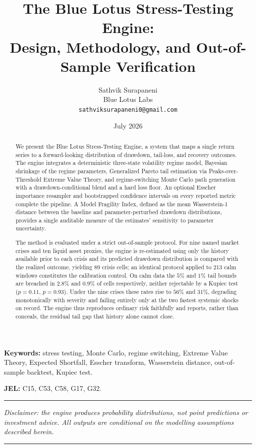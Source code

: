 \documentclass[11pt]{article}
\title{%
  \vspace{-1.2cm}
  \textbf{\Large The Blue Lotus Stress-Testing Engine:}\\[0.35em]
  \textbf{\Large Design, Methodology, and Out-of-Sample Verification}
}
\author{%
  Sathvik Surapaneni\\[0.2em]
  \small Blue Lotus Labs\\[0.1em]
  \small \texttt{sathviksurapaneni0@gmail.com}
}
\date{July 2026}
\theoremstyle{definition}
\begin{document}
\maketitle
\thispagestyle{empty}

\begin{abstract}
\noindent
We present the Blue Lotus Stress-Testing Engine, a system that maps a single
return series to a forward-looking distribution of drawdown, tail-loss, and
recovery outcomes. The engine integrates a deterministic three-state volatility
regime model, Bayesian shrinkage of the regime parameters, Generalized Pareto
tail estimation via Peaks-over-Threshold Extreme Value Theory, and
regime-switching Monte Carlo path generation with a drawdown-conditional blend and
a hard loss floor. An optional Esscher importance resampler and bootstrapped
confidence intervals on every reported metric complete the pipeline. A Model
Fragility Index, defined as the mean Wasserstein-1 distance between the baseline
and parameter-perturbed drawdown distributions, provides a single auditable measure
of the estimates' sensitivity to parameter uncertainty.

The method is evaluated under a strict out-of-sample protocol. For nine named
market crises and ten liquid asset proxies, the engine is re-estimated using only
the history available prior to each crisis and its predicted drawdown distribution
is compared with the realized outcome, yielding 89 crisis cells; an identical
protocol applied to 213 calm windows constitutes the calibration control. On calm
data the $5\%$ and $1\%$ tail bounds are breached in $2.8\%$ and $0.9\%$ of cells
respectively, neither rejectable by a Kupiec test ($p=0.11$, $p=0.93$). Under the
nine crises these rates rise to $56\%$ and $31\%$, degrading monotonically with
severity and failing entirely only at the two fastest systemic shocks on record.
The engine thus reproduces ordinary risk faithfully and reports, rather than
conceals, the residual tail gap that history alone cannot close.
\end{abstract}

\noindent\textbf{Keywords:} stress testing, Monte Carlo, regime switching,
Extreme Value Theory, Expected Shortfall, Esscher transform, Wasserstein
distance, out-of-sample backtest, Kupiec test.

\smallskip
\noindent\textbf{JEL:} C15, C53, C58, G17, G32.

\smallskip
\hrule\vspace{0.3em}
{\small\itshape Disclaimer: the engine produces probability distributions, not
point predictions or investment advice. All outputs are conditional on the
modelling assumptions described herein.}
\vspace{0.3em}\hrule
\end{document}

